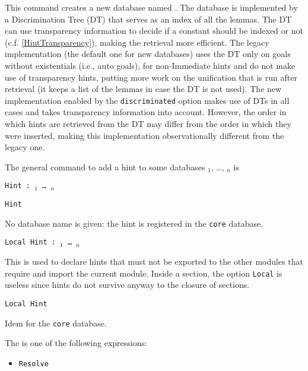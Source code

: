 \begin{coq_example*}
This command creates a new database named \ident.
The database is implemented by a Discrimination Tree (DT) that serves as
an index of all the lemmas. The DT can use transparency information to decide
if a constant should be indexed or not (c.f. \ref{HintTransparency}),
making the retrieval more efficient.
The legacy implementation (the default one for new databases) uses the
DT only on goals without existentials (i.e., auto goals), for non-Immediate
hints and do not make use of transparency hints, putting more work on the
unification that is run after retrieval (it keeps a list of the lemmas
in case the DT is not used). The new implementation enabled by
the {\tt discriminated} option makes use of DTs in all cases and takes
transparency information into account. However, the order in which hints
are retrieved from the DT may differ from the order in which they were
inserted, making this implementation observationally different from the
legacy one.

The general
command to add a hint to some databases \ident$_1$, \dots, \ident$_n$ is
\begin{tabbing}
  {\tt Hint {\hintdef} :~\ident$_1$ \mbox{\dots} \ident$_n$}
\end{tabbing}

\begin{Variants}
\item {\tt Hint \hintdef}

  No database name is given: the hint is registered in the {\tt core}
    database.

\item {\tt Local Hint {\hintdef} :~\ident$_1$ \mbox{\dots} \ident$_n$}

  This is used to declare hints that must not be exported to the other
  modules that require and import the current module. Inside a
  section, the option {\tt Local} is useless since hints do not
  survive anyway to the closure of sections.

\item {\tt Local Hint \hintdef}

  Idem for the {\tt core} database.

\end{Variants}

The {\hintdef} is one of the following expressions:

\begin{itemize}
\item {\tt Resolve \term {\zeroone{{\tt |} \zeroone{\num} \zeroone{\pattern}}}}


\end{itemize}
\end{coq_example*}
